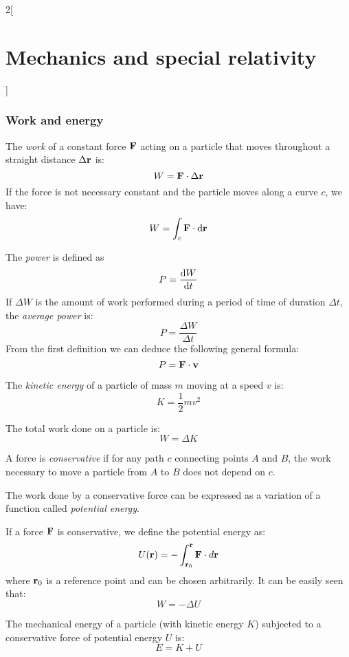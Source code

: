 \documentclass[../../../main.tex]{subfiles}
\begin{document}
\begin{multicols}{2}[\section{Mechanics and special relativity}]
  \subsubsection{Work and energy}
  \begin{definition}[Work]
    The \textit{work} of a constant force $\boldsymbol{\mathrm{F}}$ acting on a particle that moves throughout a straight distance $\Delta\boldsymbol{\mathrm{r}}$ is: $$ W=\boldsymbol{\mathrm{F}}\cdot\Delta\boldsymbol{\mathrm{r}}$$ If the force is not necessary constant and the particle moves along a curve $c$, we have: $$W=\int_c\boldsymbol{\mathrm{F}}\cdot \dd\boldsymbol{\mathrm{r}}$$
  \end{definition}
  \begin{definition}[Power]
    The \textit{power} is defined as $$P=\dv{W}{t}$$ If $\Delta W$ is the amount of work performed during a period of time of duration $\Delta t$, the \textit{average power} is: $$P=\frac{\Delta W}{\Delta t}$$ From the first definition we can deduce the following general formula: $$P=\boldsymbol{\mathrm{F}}\cdot\boldsymbol{\mathrm{v}}$$
  \end{definition}
  \begin{definition}
    The \textit{kinetic energy} of a particle of mass $m$ moving at a speed $v$ is: $$K=\frac{1}{2}mv^2$$
  \end{definition}
  \begin{theorem}
    The total work done on a particle is:
    $$W=\Delta K$$
  \end{theorem}
  \begin{definition}
    A force is \textit{conservative} if for any path $c$ connecting points $A$ and $B$, the work necessary to move a particle from $A$ to $B$ does not depend on $c$.
  \end{definition}
  \begin{prop}
    The work done by a conservative force can be expressed as a variation of a function called \textit{potential energy}.
  \end{prop}
  \begin{prop}
    If a force $\boldsymbol{\mathrm{F}}$ is conservative, we define the potential energy as: $$U(\boldsymbol{\mathrm{r}})=-\int_{\boldsymbol{\mathrm{r}}_0}^{\boldsymbol{\mathrm{r}}}\boldsymbol{\mathrm{F}}\cdot d\boldsymbol{\mathrm{r}}$$ where $\boldsymbol{\mathrm{r}}_0$ is a reference point and can be chosen arbitrarily. It can be easily seen that: $$W=-\Delta U$$
  \end{prop}
  \begin{prop}
    The mechanical energy of a particle (with kinetic energy $K$) subjected to a conservative force of potential energy $U$ is: $$E=K+U$$
  \end{prop}

\end{multicols}
\end{document}
